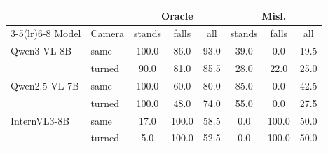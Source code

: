 \begin{tabular}{llcccccc}
\toprule
 & & \multicolumn{3}{c}{Oracle} & \multicolumn{3}{c}{Misl.} \\
\cmidrule(lr){3-5}\cmidrule(lr){6-8}
Model & Camera & stands & falls & all & stands & falls & all \\
\midrule
Qwen3-VL-8B & same & 100.0 & 86.0 & 93.0 & 39.0 & 0.0 & 19.5 \\
 & turned & 90.0 & 81.0 & 85.5 & 28.0 & 22.0 & 25.0 \\
Qwen2.5-VL-7B & same & 100.0 & 60.0 & 80.0 & 85.0 & 0.0 & 42.5 \\
 & turned & 100.0 & 48.0 & 74.0 & 55.0 & 0.0 & 27.5 \\
InternVL3-8B & same & 17.0 & 100.0 & 58.5 & 0.0 & 100.0 & 50.0 \\
 & turned & 5.0 & 100.0 & 52.5 & 0.0 & 100.0 & 50.0 \\
\bottomrule
\end{tabular}
